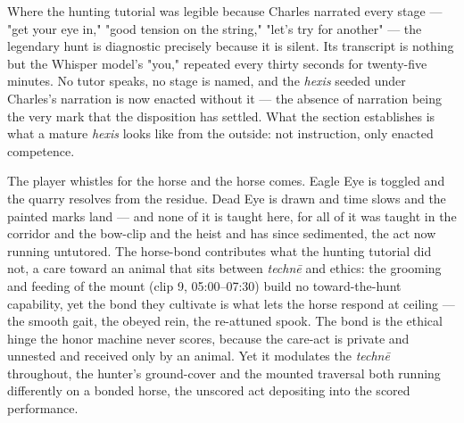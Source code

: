 \documentclass{article}
\begin{document}
Where the hunting tutorial was legible because Charles narrated every stage — "get your eye in," "good tension on the string," "let's try for another" — the legendary hunt is diagnostic precisely because it is silent. Its transcript is nothing but the Whisper model's "you," repeated every thirty seconds for twenty-five minutes. No tutor speaks, no stage is named, and the \textit{hexis} seeded under Charles's narration is now enacted without it — the absence of narration being the very mark that the disposition has settled. What the section establishes is what a mature \textit{hexis} looks like from the outside: not instruction, only enacted competence.

The player whistles for the horse and the horse comes. Eagle Eye is toggled and the quarry resolves from the residue. Dead Eye is drawn and time slows and the painted marks land — and none of it is taught here, for all of it was taught in the corridor and the bow-clip and the heist and has since sedimented, the act now running untutored. The horse-bond contributes what the hunting tutorial did not, a care toward an animal that sits between \textit{technē} and ethics: the grooming and feeding of the mount (clip 9, 05:00–07:30) build no toward-the-hunt capability, yet the bond they cultivate is what lets the horse respond at ceiling — the smooth gait, the obeyed rein, the re-attuned spook. The bond is the ethical hinge the honor machine never scores, because the care-act is private and unnested and received only by an animal. Yet it modulates the \textit{technē} throughout, the hunter's ground-cover and the mounted traversal both running differently on a bonded horse, the unscored act depositing into the scored performance.
\end{document}
